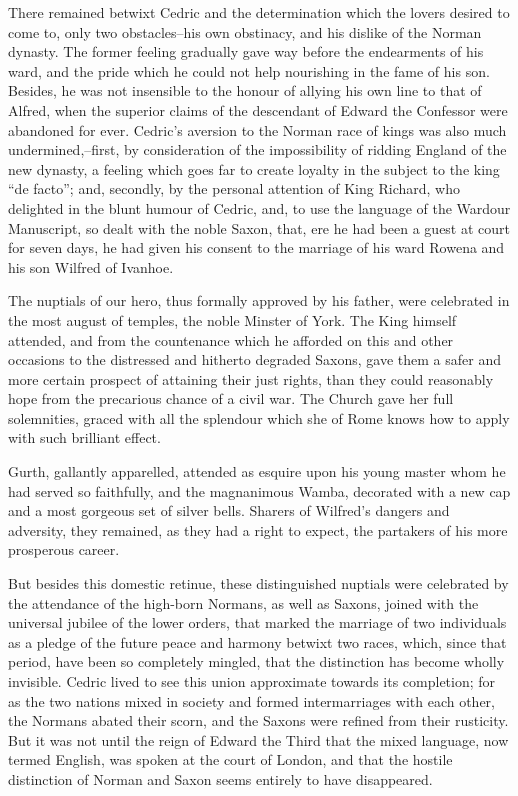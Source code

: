 There remained betwixt Cedric and the determination which the lovers
desired to come to, only two obstacles--his own obstinacy, and his
dislike of the Norman dynasty. The former feeling gradually gave way
before the endearments of his ward, and the pride which he could not
help nourishing in the fame of his son. Besides, he was not insensible
to the honour of allying his own line to that of Alfred, when the
superior claims of the descendant of Edward the Confessor were abandoned
for ever. Cedric's aversion to the Norman race of kings was also much
undermined,--first, by consideration of the impossibility of ridding
England of the new dynasty, a feeling which goes far to create loyalty
in the subject to the king ``de facto''; and, secondly, by the personal
attention of King Richard, who delighted in the blunt humour of Cedric,
and, to use the language of the Wardour Manuscript, so dealt with the
noble Saxon, that, ere he had been a guest at court for seven days, he
had given his consent to the marriage of his ward Rowena and his son
Wilfred of Ivanhoe.

The nuptials of our hero, thus formally approved by his father, were
celebrated in the most august of temples, the noble Minster of York. The
King himself attended, and from the countenance which he afforded on
this and other occasions to the distressed and hitherto degraded Saxons,
gave them a safer and more certain prospect of attaining their just
rights, than they could reasonably hope from the precarious chance of a
civil war. The Church gave her full solemnities, graced with all the
splendour which she of Rome knows how to apply with such brilliant
effect.

Gurth, gallantly apparelled, attended as esquire upon his young master
whom he had served so faithfully, and the magnanimous Wamba, decorated
with a new cap and a most gorgeous set of silver bells. Sharers of
Wilfred's dangers and adversity, they remained, as they had a right to
expect, the partakers of his more prosperous career.

But besides this domestic retinue, these distinguished nuptials were
celebrated by the attendance of the high-born Normans, as well as
Saxons, joined with the universal jubilee of the lower orders, that
marked the marriage of two individuals as a pledge of the future peace
and harmony betwixt two races, which, since that period, have been so
completely mingled, that the distinction has become wholly invisible.
Cedric lived to see this union approximate towards its completion; for
as the two nations mixed in society and formed intermarriages with each
other, the Normans abated their scorn, and the Saxons were refined from
their rusticity. But it was not until the reign of Edward the Third that
the mixed language, now termed English, was spoken at the court of
London, and that the hostile distinction of Norman and Saxon seems
entirely to have disappeared.

